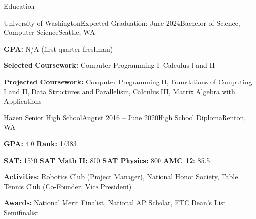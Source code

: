 \documentclass{resume} %
\begin{document}
\begin{rSection}{Education}

\begin{rSubsection}{University of Washington}{Expected Graduation: June 2024}{Bachelor of Science, Computer Science}{Seattle, WA}
\item {\bf GPA:} N/A (first-quarter freshman)
\item {\bf Selected Coursework:} Computer Programming I, Calculus I and II
\item {\bf Projected Coursework:} Computer Programming II, Foundations of Computing I and II, Data Structures and Parallelism, Calculus III, Matrix Algebra with Applications
\end{rSubsection}

\begin{rSubsection}{Hazen Senior High School}{August 2016 – June 2020}{High School Diploma}{Renton, WA}
\item {\bf GPA:} 4.0 {\bf Rank:} 1/383
\item {\bf SAT:} 1570 {\bf SAT Math II:} 800 {\bf SAT Physics:} 800 {\bf AMC 12:} 85.5
\item {\bf Activities:} Robotics Club (Project Manager), National Honor Society, Table Tennis Club (Co-Founder, Vice President)
\item {\bf Awards:} National Merit Finalist, National AP Scholar, FTC Dean's List Semifinalist
\end{rSubsection}

\end{rSection}

\end{document}
